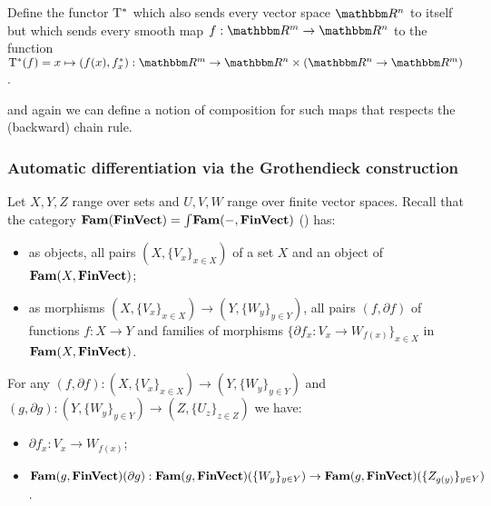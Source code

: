 \begin{definition}
Define the functor $\mathrm{T}^*$ which also sends every vector space $\RR^n$ to itself but which sends every
smooth map $f: \RR^m \to \RR^n$ to the function $\tangents^*(f) = x \mapsto (f(x), \pullf{f}_x): \RR^m \to
\RR^n \times (\RR^n \to \RR^m)$.
\end{definition}

\noindent and again we can define a notion of composition for such maps that respects the (backward) chain
rule.

\subsubsection{Automatic differentiation via the Grothendieck construction}

Let $X, Y, Z$ range over sets and $U, V, W$ range over finite vector spaces. Recall that the category
$\mathbf{Fam}(\mathbf{FinVect}) = \int_{}\mathbf{Fam}(-, \mathbf{FinVect})$ () has:
\begin{itemize}
\item as objects, all pairs $(X, \{V_x\}_{x \in X})$ of a set $X$ and an object of $\mathbf{Fam}(X,\mathbf{FinVect})$;
\item as morphisms $(X, \{V_x\}_{x \in X}) \to (Y, \{W_y\}_{y \in Y})$, all pairs $(f, \partial f)$ of
functions $f: X \to Y$ and families of morphisms $\{\partial f_x: V_x \to W_{f(x)}\}_{x \in X}$
in $\mathbf{Fam}(X,\mathbf{FinVect})$.
\end{itemize}

For any $(f, \partial f): (X, \{V_x\}_{x \in X}) \to (Y, \{W_y\}_{y \in Y})$ and $(g, \partial g): (Y,
\{W_y\}_{y \in Y}) \to (Z, \{U_z\}_{z \in Z})$ we have:
\begin{itemize}
\item $\partial f_x: V_x \to W_{f(x)}$;
\item $\mathbf{Fam}(g, \mathbf{FinVect})(\partial g): \mathbf{Fam}(g, \mathbf{FinVect})(\{W_y\}_{y \in Y}) \to \mathbf{Fam}(g, \mathbf{FinVect})(\{Z_{g(y)}\}_{y \in Y})$.
\end{itemize}
